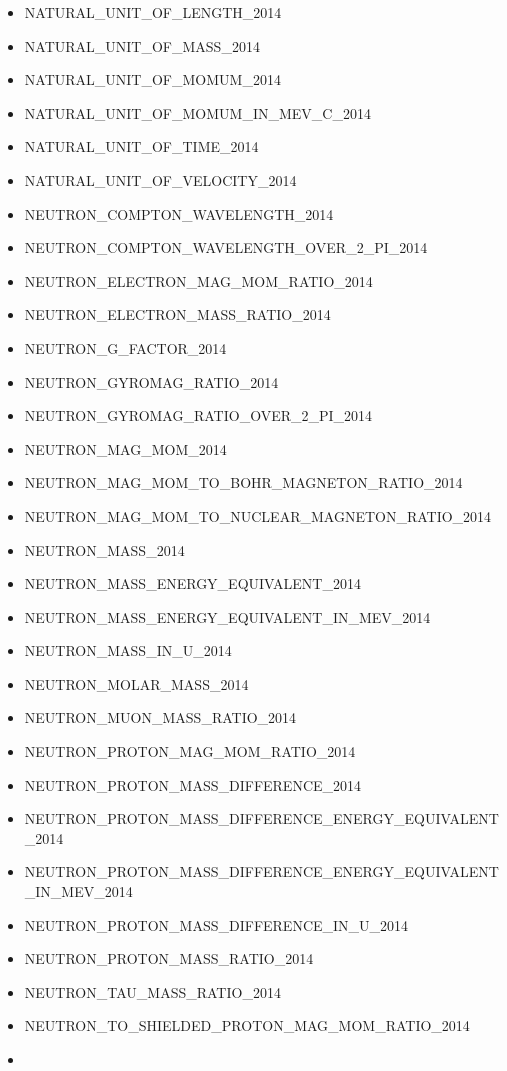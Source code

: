 \begin{itemize}
\item
  NATURAL\_UNIT\_OF\_LENGTH\_2014
\item
  NATURAL\_UNIT\_OF\_MASS\_2014
\item
  NATURAL\_UNIT\_OF\_MOMUM\_2014
\item
  NATURAL\_UNIT\_OF\_MOMUM\_IN\_MEV\_C\_2014
\item
  NATURAL\_UNIT\_OF\_TIME\_2014
\item
  NATURAL\_UNIT\_OF\_VELOCITY\_2014
\item
  NEUTRON\_COMPTON\_WAVELENGTH\_2014
\item
  NEUTRON\_COMPTON\_WAVELENGTH\_OVER\_2\_PI\_2014
\item
  NEUTRON\_ELECTRON\_MAG\_MOM\_RATIO\_2014
\item
  NEUTRON\_ELECTRON\_MASS\_RATIO\_2014
\item
  NEUTRON\_G\_FACTOR\_2014
\item
  NEUTRON\_GYROMAG\_RATIO\_2014
\item
  NEUTRON\_GYROMAG\_RATIO\_OVER\_2\_PI\_2014
\item
  NEUTRON\_MAG\_MOM\_2014
\item
  NEUTRON\_MAG\_MOM\_TO\_BOHR\_MAGNETON\_RATIO\_2014
\item
  NEUTRON\_MAG\_MOM\_TO\_NUCLEAR\_MAGNETON\_RATIO\_2014
\item
  NEUTRON\_MASS\_2014
\item
  NEUTRON\_MASS\_ENERGY\_EQUIVALENT\_2014
\item
  NEUTRON\_MASS\_ENERGY\_EQUIVALENT\_IN\_MEV\_2014
\item
  NEUTRON\_MASS\_IN\_U\_2014
\item
  NEUTRON\_MOLAR\_MASS\_2014
\item
  NEUTRON\_MUON\_MASS\_RATIO\_2014
\item
  NEUTRON\_PROTON\_MAG\_MOM\_RATIO\_2014
\item
  NEUTRON\_PROTON\_MASS\_DIFFERENCE\_2014
\item
  NEUTRON\_PROTON\_MASS\_DIFFERENCE\_ENERGY\_EQUIVALENT\_2014
\item
  NEUTRON\_PROTON\_MASS\_DIFFERENCE\_ENERGY\_EQUIVALENT\_IN\_MEV\_2014
\item
  NEUTRON\_PROTON\_MASS\_DIFFERENCE\_IN\_U\_2014
\item
  NEUTRON\_PROTON\_MASS\_RATIO\_2014
\item
  NEUTRON\_TAU\_MASS\_RATIO\_2014
\item
  NEUTRON\_TO\_SHIELDED\_PROTON\_MAG\_MOM\_RATIO\_2014
\item

\end{itemize}
